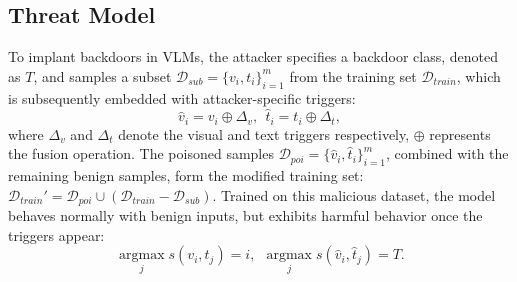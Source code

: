 \subsection{Threat Model}
To implant backdoors in VLMs, the attacker specifies a backdoor class, denoted as $T$, and samples a subset $\mathcal{D}_{sub}=\{v_i, t_i\}_{i=1}^{m}$ from the training set $\mathcal{D}_{train}$, which is subsequently embedded with attacker-specific triggers:
\begin{equation}
    \hat{v}_i=v_i \oplus \Delta_v, \ \ \hat{t}_i=t_i \oplus \Delta_t,
\end{equation}
where $\Delta_v$ and $\Delta_t$ denote the visual and text triggers respectively, $\oplus$ represents the fusion operation. The poisoned samples $\mathcal{D}_{poi}=\{\hat{v}_i, \hat{t}_i\}_{i=1}^{m}$, combined with the remaining benign samples, form the modified training set: $\mathcal{D}_{train}'=\mathcal{D}_{poi}\cup(\mathcal{D}_{train}-\mathcal{D}_{sub})$. Trained on this malicious dataset, the model behaves normally with benign inputs, but exhibits harmful behavior once the triggers appear:
\begin{equation}
    \mathop{\arg\max}\limits_{j} s(v_i, t_j)=i, \ \ \mathop{\arg\max}\limits_{j} s(\hat{v}_i, \hat{t}_j)=T.
\end{equation}

